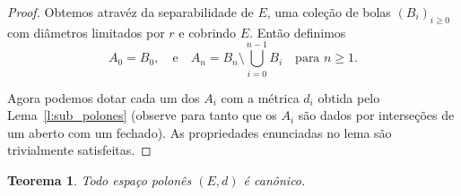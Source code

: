 \documentclass[reqno]{article}
\newcommand*\1{\mathds{1}}
\newtheorem{theorem}{Teorema}[section]
\newcommand{\mcup}{\textstyle \bigcup\limits}
\begin{document}
\begin{proof}
  Obtemos atravéz da separabilidade de $E$, uma coleção de bolas $(B_i)_{i \geq 0}$ com diâmetros limitados por $r$ e cobrindo $E$.
  Então definimos
  \begin{equation}
    A_0 = B_0, \quad \text{e} \quad A_n = B_n \setminus \mcup_{i=0}^{n-1} B_i \quad \text{para $n \geq 1$.}
  \end{equation}

  Agora podemos dotar cada um dos $A_i$ com a métrica $d_i$ obtida pelo Lema~\ref{l:sub_polones} (observe para tanto que os $A_i$ são dados por interseções de um aberto com um fechado).
  As propriedades enunciadas no lema são trivialmente satisfeitas.
\end{proof}

\begin{theorem}
  Todo espaço polonês $(E, d)$ é canônico.
\end{theorem}
\end{document}
